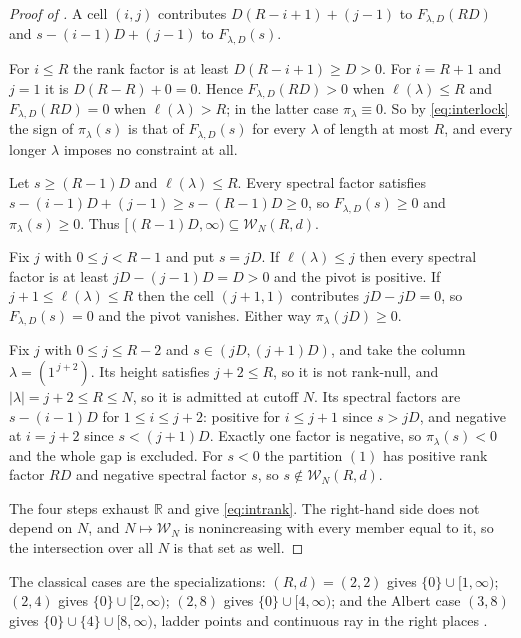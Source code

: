 \documentclass[11pt,letterpaper]{article}
\newcommand{\Rr}{\mathbb{R}}
\begin{document}
\begin{proof}[Proof of ]
A cell $(i,j)$ contributes $D(R-i+1)+(j-1)$ to $F_{\lambda,D}(RD)$ and
$s-(i-1)D+(j-1)$ to $F_{\lambda,D}(s)$.

For $i\le R$ the rank factor is at least $D(R-i+1)\ge D>0$. For $i=R+1$ and
$j=1$ it is $D(R-R)+0=0$. Hence $F_{\lambda,D}(RD)>0$ when $\ell(\lambda)\le R$
and $F_{\lambda,D}(RD)=0$ when $\ell(\lambda)>R$; in the latter case
$\pi_\lambda\equiv0$. So by \eqref{eq:interlock} the sign of $\pi_\lambda(s)$ is
that of $F_{\lambda,D}(s)$ for every $\lambda$ of length at most $R$, and every
longer $\lambda$ imposes no constraint at all.

Let $s\ge(R-1)D$ and $\ell(\lambda)\le R$. Every spectral factor satisfies
$s-(i-1)D+(j-1)\ge s-(R-1)D\ge0$, so $F_{\lambda,D}(s)\ge0$ and
$\pi_\lambda(s)\ge0$. Thus $[(R-1)D,\infty)\subseteq\mathcal{W}_N(R,d)$.

Fix $j$ with $0\le j<R-1$ and put $s=jD$. If $\ell(\lambda)\le j$ then every
spectral factor is at least $jD-(j-1)D=D>0$ and the pivot is positive. If
$j+1\le\ell(\lambda)\le R$ then the cell $(j+1,1)$ contributes $jD-jD=0$, so
$F_{\lambda,D}(s)=0$ and the pivot vanishes. Either way $\pi_\lambda(jD)\ge0$.

Fix $j$ with $0\le j\le R-2$ and $s\in(jD,(j+1)D)$, and take the column
$\lambda=(1^{\,j+2})$. Its height satisfies $j+2\le R$, so it is not rank-null,
and $|\lambda|=j+2\le R\le N$, so it is admitted at cutoff $N$. Its spectral
factors are $s-(i-1)D$ for $1\le i\le j+2$: positive for $i\le j+1$ since
$s>jD$, and negative at $i=j+2$ since $s<(j+1)D$. Exactly one factor is
negative, so $\pi_\lambda(s)<0$ and the whole gap is excluded. For $s<0$ the
partition $(1)$ has positive rank factor $RD$ and negative spectral factor $s$,
so $s\notin\mathcal{W}_N(R,d)$.

The four steps exhaust $\Rr$ and give \eqref{eq:intrank}. The right-hand side
does not depend on $N$, and $N\mapsto\mathcal{W}_N$ is nonincreasing with every
member equal to it, so the intersection over all $N$ is that set as well.
\end{proof}

The classical cases are the specializations: $(R,d)=(2,2)$ gives
$\{0\}\cup[1,\infty)$; $(2,4)$ gives $\{0\}\cup[2,\infty)$; $(2,8)$ gives
$\{0\}\cup[4,\infty)$; and the Albert case $(3,8)$ gives
$\{0\}\cup\{4\}\cup[8,\infty)$, ladder points and continuous ray in the right
places \cite[Ch.~XIII]{FK}.
\end{document}
